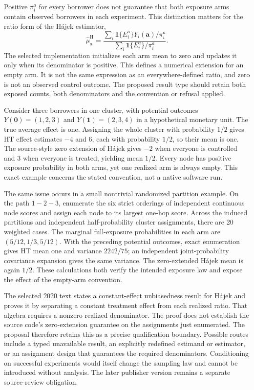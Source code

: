 Positive $\pi_i^a$ for every borrower does not guarantee that both exposure arms contain observed borrowers in each experiment. This distinction matters for the ratio form of the H\'ajek estimator,
\[
 \widehat\mu_a^{\mathrm{H}}=
 \frac{\sum_i\mathbf{1}\{E_i^a\}Y_i(\mathbf a)/\pi_i^a}
      {\sum_i\mathbf{1}\{E_i^a\}/\pi_i^a}.
\]
The selected implementation initializes each arm mean to zero and updates it only when its denominator is positive. This defines a numerical extension for an empty arm. It is not the same expression as an everywhere-defined ratio, and zero is not an observed control outcome. The proposed result type should retain both exposed counts, both denominators and the convention or refusal applied.\citep{exec25_cnet_rgcr,exec25_cnet_choice}

Consider three borrowers in one cluster, with potential outcomes $Y(\mathbf0)=(1,2,3)$ and $Y(\mathbf1)=(2,3,4)$ in a hypothetical monetary unit. The true average effect is one. Assigning the whole cluster with probability $1/2$ gives HT effect estimates $-4$ and $6$, each with probability $1/2$, so their mean is one. The source-style zero extension of H\'ajek gives $-2$ when everyone is controlled and $3$ when everyone is treated, yielding mean $1/2$. Every node has positive exposure probability in both arms, yet one realized arm is always empty. This exact example concerns the stated convention, not a native software run.\citep{exec25_cnet_choice}

The same issue occurs in a small nontrivial randomized partition example. On the path $1-2-3$, enumerate the six strict orderings of independent continuous node scores and assign each node to its largest one-hop score. Across the induced partitions and independent half-probability cluster assignments, there are 20 weighted cases. The marginal full-exposure probabilities in each arm are $(5/12,1/3,5/12)$. With the preceding potential outcomes, exact enumeration gives HT mean one and variance $2242/75$; an independent joint-probability covariance expansion gives the same variance. The zero-extended H\'ajek mean is again $1/2$. These calculations both verify the intended exposure law and expose the effect of the empty-arm convention.\citep{exec25_cnet_choice}

The selected 2020 text states a constant-effect unbiasedness result for H\'ajek and proves it by separating a constant treatment effect from each realized ratio. That algebra requires a nonzero realized denominator. The proof does not establish the source code's zero-extension guarantee on the assignments just enumerated. The proposal therefore retains this as a precise qualification boundary. Possible routes include a typed unavailable result, an explicitly redefined estimand or estimator, or an assignment design that guarantees the required denominators. Conditioning on successful experiments would itself change the sampling law and cannot be introduced without analysis. The later publisher version remains a separate source-review obligation.\citep{exec25_cnet_paper,exec25_cnet_choice}

